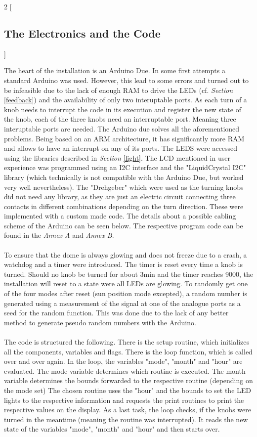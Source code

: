 \documentclass[a4paper,9pt]{article}
\begin{document}
\begin{multicols}{2}
[
    \subsection{The Electronics and the Code}
    \label{elec}
    ]

    The heart of the installation is an Arduino Due. In some first attempts a standard Arduino was used. However, this lead to some errors and turned out to be infeasible due to the lack of enough RAM to drive the LEDs (cf. \textit{Section} \ref{feedback}) and the availability of only two interuptable ports. As each turn of a knob needs to interrupt the code in its execution and register the new state of the knob, each of the three knobs need an interruptable port. Meaning three interuptable ports are needed. The Arduino due solves all the aforementioned problems. Being based on an ARM architecture, it has significantly more RAM and allows to have an interrupt on any of its ports. The LEDS were accessed using the libraries described in \textit{Section} \ref{light}. The LCD mentioned in user experience was programmed using an I2C interface and the "LiquidCrystal I2C" library (which technically is not compatible with the Arduino Due, but worked very well nevertheless). The "Drehgeber" which were used as the turning knobs did not need any library, as they are just an electric circuit connecting three contacts in different combinations depending on the turn direction. These were implemented with a custom made code. The details about a possible cabling scheme of the Arduino can be seen below. The respective program code can be found in the \textit{Annex A} and \textit{Annex B}.\\
    \\
    To ensure that the dome is always glowing and does not freeze due to a crash, a watchdog and a timer were introduced. The timer is reset every time a knob is turned. Should no knob be turned for about 3min and the timer reaches 9000, the installation will reset to a state were all LEDs are glowing. To randomly get one of the four modes after reset (sun position mode excepted), a random number is generated using a measurement of the signal at one of the analogue ports as a seed for the random function. This was done due to the lack of any better method to generate pseudo random numbers with the Arduino.\\
    \\
    The code is structured the following. There is the setup routine, which initializes all the components, variables and flags. There is the loop function, which is called over and over again. In the loop, the variables "mode", "month" and "hour" are evaluated. The mode variable determines which routine is executed. The month variable determines the bounds forwarded to the respective routine (depending on the mode set) The chosen routine uses the "hour" and the bounds to set the LED lights to the respective information and requests the print routines to print the respective values on the display. As a last task, the loop checks, if the knobs were turned in the meantime (meaning the routine was interrupted). It reads the new state of the variables "mode", "month" and "hour" and then starts over.\\

\end{multicols}
\end{document}
